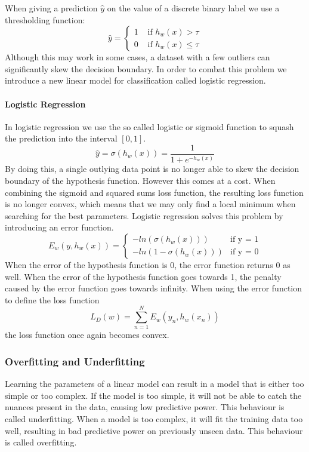 When giving a prediction $\hat{y}$ on the value of a discrete binary label we use a thresholding function:
\[
\hat{y} = 
\begin{cases}
  1 &\text{ if } h_w(x) > \tau \\
  0 &\text{ if } h_w(x) \leq \tau  
\end{cases}
\] 
Although this may work in some cases, a dataset with a few outliers can significantly skew the decision boundary.
In order to combat this problem we introduce a new linear model for classification called logistic regression.

\paragraph{Logistic Regression}\label{sec:logistic}

In logistic regression we use the so called logistic or sigmoid function to squash the prediction into the interval $[0,1]$.
\[ \hat{y} = \sigma(h_w(x)) = \frac{1}{1+e^{-h_w(x)}} \]
By doing this, a single outlying data point is no longer able to skew the decision boundary of the hypothesis function.
However this comes at a cost.
When combining the sigmoid and squared sums loss function, the resulting loss function is no longer convex, which means that we may only find a local minimum when searching for the best parameters.
Logistic regression solves this problem by introducing an error function.
\[E_w(y,h_w(x)) = \begin{cases}
	-ln(\sigma(h_w(x))) &\text{if y = 1}\\	
	-ln(1-\sigma(h_w(x))) &\text{if y = 0}
\end{cases}\]
When the error of the hypothesis function is 0, the error function returns 0 as well. When the error of the hypothesis function goes towards 1, the penalty caused by the error function goes towards infinity.
When using the error function to define the loss function
$$L_D(w) = \sum_{n=1}^N E_w(y_n, h_w(x_n))$$
the loss function once again becomes convex.

\subsubsection{Overfitting and Underfitting}
Learning the parameters of a linear model can result in a model that is either too simple or too complex.
If the model is too simple, it will not be able to catch the nuances present in the data, causing low predictive power. This behaviour is called underfitting.
When a model is too complex, it will fit the training data too well, resulting in bad predictive power on previously unseen data. This behaviour is called overfitting. 

